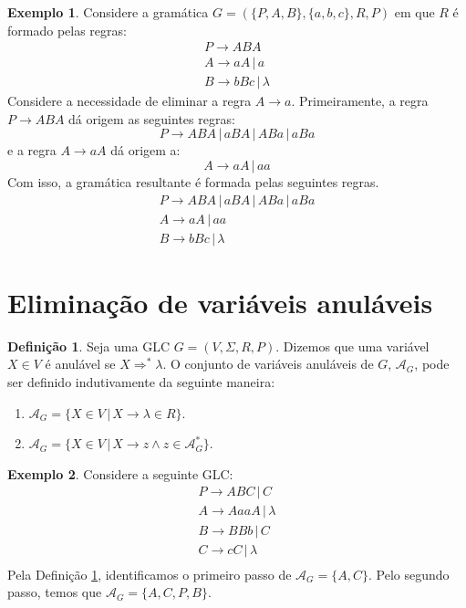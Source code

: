 \documentclass[a4paper]{article}
\theoremstyle{definition}
\newtheorem{Example}{Exemplo}
\newtheorem{Definition}{Definição}
\begin{document}
  \begin{Example}
    Considere a gramática $G = (\{P,A,B\},\{a,b,c\},R,P)$ em que $R$ é
    formado pelas regras:
    \[
      \begin{array}{l}
        P \to ABA\\
        A \to aA\,|\,a \\
        B \to bBc\,|\,\lambda
      \end{array}
    \]
    Considere a necessidade de eliminar a regra $A\to a$. Primeiramente,
    a regra $P \to ABA$ dá origem as seguintes regras:
    \[
      P \to ABA\,|\,aBA\,|\,ABa\,|\,aBa
    \]
    e a regra $A \to aA$ dá origem a:
    \[
      A \to aA \,|\, aa
    \]
    Com isso, a gramática resultante é formada pelas seguintes regras.
    \[
      \begin{array}{l}
        P \to ABA\,|\,aBA\,|\,ABa\,|\,aBa\\
        A \to aA\,|\,aa \\
        B \to bBc\,|\,\lambda
      \end{array}
    \]
  \end{Example}

  \section{Eliminação de variáveis anuláveis}

  \begin{Definition}\label{varanul}
    Seja uma GLC $G = (V,\Sigma,R,P)$. Dizemos que uma variável $X \in V$ é
    anulável se $X \Rightarrow^* \lambda$. O conjunto de variáveis anuláveis de
    $G$, $\mathcal{A}_G$, pode ser definido indutivamente da seguinte maneira:
    \begin{enumerate}
       \item $\mathcal{A}_G = \{ X \in V \,|\, X \to \lambda \in R\}$.
       \item $\mathcal{A}_G = \{ X \in V \,|\, X \to z \land z \in \mathcal{A}_G^*\}$.   
    \end{enumerate}
  \end{Definition}

  \begin{Example}
    Considere a seguinte GLC:
    \[
      \begin{array}{l}
        P \to ABC \,|\, C\\
        A \to AaaA \,|\, \lambda\\
        B \to BBb \,|\,C \\
        C \to cC \,|\, \lambda\\
      \end{array}
    \]
    Pela Definição \ref{varanul}, identificamos o primeiro passo de
    $\mathcal{A}_G =\{A,C\}$. Pelo segundo passo, temos que
    $\mathcal{A}_G=\{A,C,P,B\}$.
  \end{Example}
\end{document}
